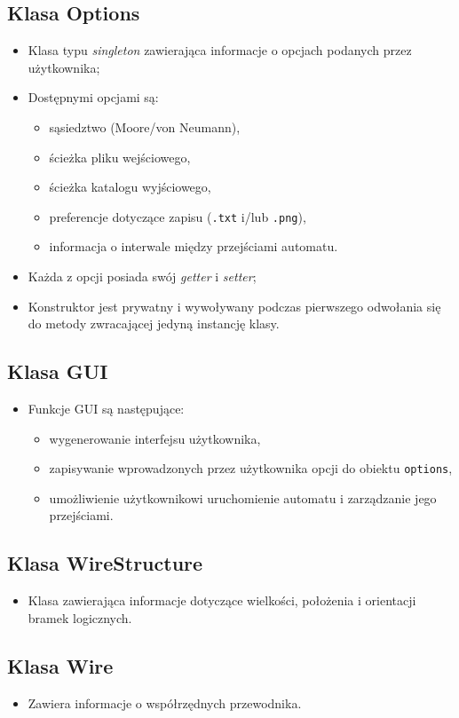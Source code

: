 \documentclass[a4paper,12pt]{article}
\begin{document}
\subsection{Klasa Options}
\begin{itemize}
\item Klasa typu \textit{singleton} zawierająca informacje o opcjach podanych przez użytkownika;
\item Dostępnymi opcjami są:
	\begin{itemize}
	\item sąsiedztwo (Moore/von Neumann),
	\item ścieżka pliku wejściowego,
	\item ścieżka katalogu wyjściowego,
	\item preferencje dotyczące zapisu (\texttt{.txt} i/lub \texttt{.png}),
	\item informacja o interwale między przejściami automatu.
	\end{itemize}
\item Każda z opcji posiada swój \textit{getter} i \textit{setter};
\item Konstruktor jest prywatny i wywoływany podczas pierwszego odwołania się do metody zwracającej jedyną instancję klasy.
\end{itemize}
\subsection{Klasa GUI}
\begin{itemize}
\item Funkcje GUI są następujące:
	\begin{itemize}
	\item wygenerowanie interfejsu użytkownika,
	\item zapisywanie wprowadzonych przez użytkownika opcji do obiektu \texttt{op\-tions},
	\item umożliwienie użytkownikowi uruchomienie automatu i zarządzanie jego przejściami.
	\end{itemize} 
\end{itemize}
\subsection{Klasa WireStructure}
\begin{itemize}
\item Klasa zawierająca informacje dotyczące wielkości, położenia i orientacji bramek logicznych.
\end{itemize}
\subsection{Klasa Wire}
\begin{itemize}
\item Zawiera informacje o współrzędnych przewodnika.
\end{itemize}
\end{document}

